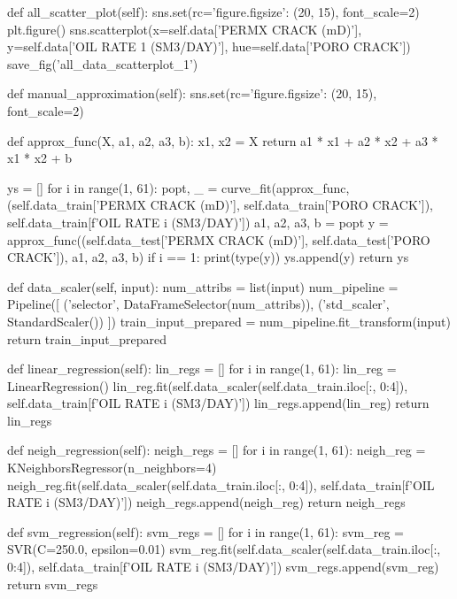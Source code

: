 \begin{pythoncode}
    def all_scatter_plot(self):
        sns.set(rc={'figure.figsize': (20, 15)}, font_scale=2)
        plt.figure()
        sns.scatterplot(x=self.data['PERMX CRACK (mD)'],
                        y=self.data['OIL RATE 1 (SM3/DAY)'],
                        hue=self.data['PORO CRACK'])
        save_fig('all_data_scatterplot_1')

    def manual_approximation(self):
        sns.set(rc={'figure.figsize': (20, 15)}, font_scale=2)

        def approx_func(X, a1, a2, a3, b):
            x1, x2 = X
            return a1 * x1 + a2 * x2 + a3 * x1 * x2 + b

        ys = []
        for i in range(1, 61):
            popt, _ = curve_fit(approx_func,
                                (self.data_train['PERMX CRACK (mD)'],
                                 self.data_train['PORO CRACK']),
                                self.data_train[f'OIL RATE {i} (SM3/DAY)'])
            a1, a2, a3, b = popt
            y = approx_func((self.data_test['PERMX CRACK (mD)'],
                             self.data_test['PORO CRACK']), a1, a2, a3, b)
            if i == 1:
                print(type(y))
            ys.append(y)
        return ys

    def data_scaler(self, input):
        num_attribs = list(input)
        num_pipeline = Pipeline([
            ('selector', DataFrameSelector(num_attribs)),
            ('std_scaler', StandardScaler())
        ])
        train_input_prepared = num_pipeline.fit_transform(input)
        return train_input_prepared

    def linear_regression(self):
        lin_regs = []
        for i in range(1, 61):
            lin_reg = LinearRegression()
            lin_reg.fit(self.data_scaler(self.data_train.iloc[:, 0:4]),
                        self.data_train[f'OIL RATE {i} (SM3/DAY)'])
            lin_regs.append(lin_reg)
        return lin_regs

    def neigh_regression(self):
        neigh_regs = []
        for i in range(1, 61):
            neigh_reg = KNeighborsRegressor(n_neighbors=4)
            neigh_reg.fit(self.data_scaler(self.data_train.iloc[:, 0:4]),
                          self.data_train[f'OIL RATE {i} (SM3/DAY)'])
            neigh_regs.append(neigh_reg)
        return neigh_regs

    def svm_regression(self):
        svm_regs = []
        for i in range(1, 61):
            svm_reg = SVR(C=250.0, epsilon=0.01)
            svm_reg.fit(self.data_scaler(self.data_train.iloc[:, 0:4]),
                        self.data_train[f'OIL RATE {i} (SM3/DAY)'])
            svm_regs.append(svm_reg)
        return svm_regs


\end{pythoncode}
